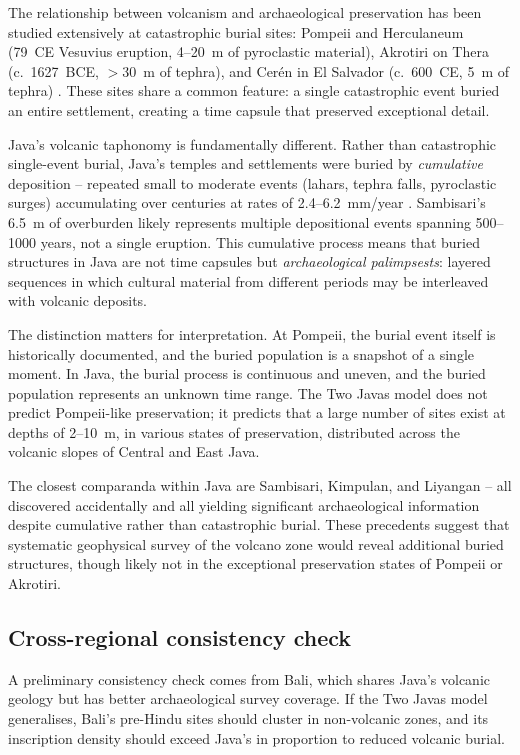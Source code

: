 \documentclass[12pt]{article}
\begin{document}
The relationship between volcanism and archaeological preservation has been studied extensively at catastrophic burial sites: Pompeii and Herculaneum (79~CE Vesuvius eruption, 4--20~m of pyroclastic material), Akrotiri on Thera (c.~1627~BCE, $>$30~m of tephra), and Cer\'{e}n in El Salvador (c.~600~CE, 5~m of tephra) \citep{Doumas1983, Sheets2002}.
These sites share a common feature: a single catastrophic event buried an entire settlement, creating a time capsule that preserved exceptional detail.

Java's volcanic taphonomy is fundamentally different.
Rather than catastrophic single-event burial, Java's temples and settlements were buried by \emph{cumulative} deposition -- repeated small to moderate events (lahars, tephra falls, pyroclastic surges) accumulating over centuries at rates of 2.4--6.2~mm/year \citep{Lavigne2000}.
Sambisari's 6.5~m of overburden likely represents multiple depositional events spanning 500--1000 years, not a single eruption.
This cumulative process means that buried structures in Java are not time capsules but \emph{archaeological palimpsests}: layered sequences in which cultural material from different periods may be interleaved with volcanic deposits.

The distinction matters for interpretation.
At Pompeii, the burial event itself is historically documented, and the buried population is a snapshot of a single moment.
In Java, the burial process is continuous and uneven, and the buried population represents an unknown time range.
The Two Javas model does not predict Pompeii-like preservation; it predicts that a large number of sites exist at depths of 2--10~m, in various states of preservation, distributed across the volcanic slopes of Central and East Java.

The closest comparanda within Java are Sambisari, Kimpulan, and Liyangan -- all discovered accidentally and all yielding significant archaeological information despite cumulative rather than catastrophic burial.
These precedents suggest that systematic geophysical survey of the volcano zone would reveal additional buried structures, though likely not in the exceptional preservation states of Pompeii or Akrotiri.

\subsection{Cross-regional consistency check}

A preliminary consistency check comes from Bali, which shares Java's volcanic geology but has better archaeological survey coverage.
If the Two Javas model generalises, Bali's pre-Hindu sites should cluster in non-volcanic zones, and its inscription density should exceed Java's in proportion to reduced volcanic burial.
\end{document}

